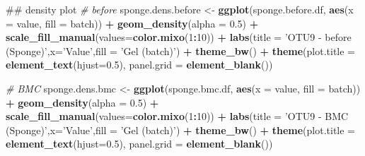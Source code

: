 \documentclass[]{book}
\newenvironment{Shaded}{\begin{snugshade}}{\end{snugshade}}
\newcommand{\KeywordTok}[1]{\textcolor[rgb]{0.13,0.29,0.53}{\textbf{#1}}}
\newcommand{\DataTypeTok}[1]{\textcolor[rgb]{0.13,0.29,0.53}{#1}}
\newcommand{\DecValTok}[1]{\textcolor[rgb]{0.00,0.00,0.81}{#1}}
\newcommand{\FloatTok}[1]{\textcolor[rgb]{0.00,0.00,0.81}{#1}}
\newcommand{\StringTok}[1]{\textcolor[rgb]{0.31,0.60,0.02}{#1}}
\newcommand{\CommentTok}[1]{\textcolor[rgb]{0.56,0.35,0.01}{\textit{#1}}}
\newcommand{\OperatorTok}[1]{\textcolor[rgb]{0.81,0.36,0.00}{\textbf{#1}}}
\newcommand{\NormalTok}[1]{#1}
\begin{document}
\begin{Shaded}
\begin{Highlighting}[]
\NormalTok{## density plot}
\CommentTok{# before}
\NormalTok{sponge.dens.before <-}\StringTok{ }\KeywordTok{ggplot}\NormalTok{(sponge.before.df, }\KeywordTok{aes}\NormalTok{(}\DataTypeTok{x =}\NormalTok{ value, }\DataTypeTok{fill =}\NormalTok{ batch)) }\OperatorTok{+}\StringTok{ }\KeywordTok{geom_density}\NormalTok{(}\DataTypeTok{alpha =} \FloatTok{0.5}\NormalTok{) }\OperatorTok{+}\StringTok{ }\KeywordTok{scale_fill_manual}\NormalTok{(}\DataTypeTok{values=}\KeywordTok{color.mixo}\NormalTok{(}\DecValTok{1}\OperatorTok{:}\DecValTok{10}\NormalTok{)) }\OperatorTok{+}\StringTok{ }\KeywordTok{labs}\NormalTok{(}\DataTypeTok{title =} \StringTok{'OTU9 - before (Sponge)'}\NormalTok{,}\DataTypeTok{x=}\StringTok{'Value'}\NormalTok{,}\DataTypeTok{fill =} \StringTok{'Gel (batch)'}\NormalTok{) }\OperatorTok{+}\StringTok{ }\KeywordTok{theme_bw}\NormalTok{() }\OperatorTok{+}\StringTok{ }\KeywordTok{theme}\NormalTok{(}\DataTypeTok{plot.title =} \KeywordTok{element_text}\NormalTok{(}\DataTypeTok{hjust=}\FloatTok{0.5}\NormalTok{), }\DataTypeTok{panel.grid =} \KeywordTok{element_blank}\NormalTok{())}

\CommentTok{# BMC}
\NormalTok{sponge.dens.bmc <-}\StringTok{ }\KeywordTok{ggplot}\NormalTok{(sponge.bmc.df, }\KeywordTok{aes}\NormalTok{(}\DataTypeTok{x =}\NormalTok{ value, }\DataTypeTok{fill =}\NormalTok{ batch)) }\OperatorTok{+}\StringTok{ }\KeywordTok{geom_density}\NormalTok{(}\DataTypeTok{alpha =} \FloatTok{0.5}\NormalTok{) }\OperatorTok{+}\StringTok{ }\KeywordTok{scale_fill_manual}\NormalTok{(}\DataTypeTok{values=}\KeywordTok{color.mixo}\NormalTok{(}\DecValTok{1}\OperatorTok{:}\DecValTok{10}\NormalTok{)) }\OperatorTok{+}\StringTok{ }\KeywordTok{labs}\NormalTok{(}\DataTypeTok{title =} \StringTok{'OTU9 - BMC (Sponge)'}\NormalTok{,}\DataTypeTok{x=}\StringTok{'Value'}\NormalTok{,}\DataTypeTok{fill =} \StringTok{'Gel (batch)'}\NormalTok{) }\OperatorTok{+}\StringTok{ }\KeywordTok{theme_bw}\NormalTok{() }\OperatorTok{+}\StringTok{ }\KeywordTok{theme}\NormalTok{(}\DataTypeTok{plot.title =} \KeywordTok{element_text}\NormalTok{(}\DataTypeTok{hjust=}\FloatTok{0.5}\NormalTok{), }\DataTypeTok{panel.grid =} \KeywordTok{element_blank}\NormalTok{())}



\end{Highlighting}
\end{Shaded}
\end{document}
